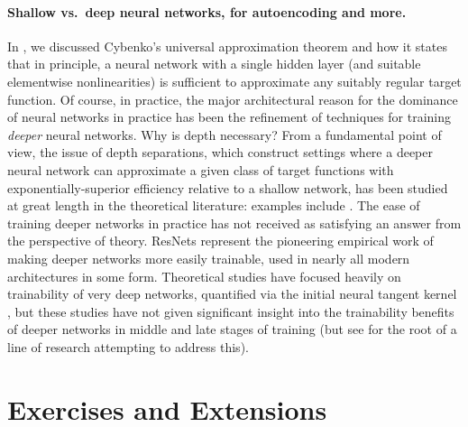 \documentclass[../../book-main.tex]{subfiles}
\begin{document}
\paragraph{Shallow vs.\ deep neural networks, for autoencoding and more.}
In , we discussed Cybenko's universal approximation
theorem and how it states that in principle, a neural network with a single
hidden layer (and suitable elementwise nonlinearities) is sufficient to
approximate any suitably regular target function. Of course, in practice, the
major architectural reason for the dominance of neural networks in practice has
been the refinement of techniques for training \textit{deeper} neural networks.
Why is depth necessary?
From a fundamental point of view, the issue of depth separations, which
construct settings where a deeper neural network can approximate a given class
of target functions with exponentially-superior efficiency relative to a shallow
network,
has been studied at great length in the theoretical literature:
examples include \cite{Telgarsky2016-sn,Bresler2020-xy,Venturi2021-qc}. 
The ease of training deeper
networks in practice has not received as satisfying an answer from the
perspective of theory. 
ResNets \cite{he2016deep} represent the pioneering empirical work of
making deeper networks more easily trainable, used in nearly all modern
architectures in some form. Theoretical studies have focused heavily on
trainability of very deep networks, quantified via the initial neural tangent
kernel \cite{Buchanan2021-sj,Martens2021-cx}, but these studies have not given
significant insight into the trainability benefits of deeper networks in middle
and late stages of training (but see \cite{Yang2021-gw} for the root of a line
of research attempting to address this).

\section{Exercises and Extensions}
\end{document}
